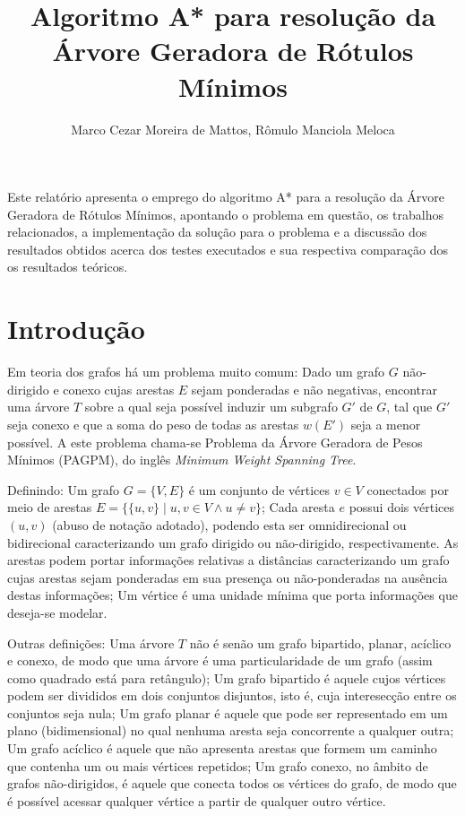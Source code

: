 \documentclass[12pt]{article}
\title{Algoritmo A* para resolução da Árvore Geradora de Rótulos Mínimos}
\author{Marco Cezar Moreira de Mattos\inst{1}, Rômulo Manciola Meloca\inst{1}}
\begin{document}
\maketitle

\begin{resumo}
	Este relatório apresenta o emprego do algoritmo A* para a resolução da Árvore Geradora de Rótulos Mínimos, apontando o problema em questão, os trabalhos relacionados, a implementação da solução para o problema e a discussão dos resultados obtidos acerca dos testes executados e sua respectiva comparação dos os resultados teóricos.
\end{resumo}

\section{Introdução}\label{sec:introducao}

	Em teoria dos grafos há um problema muito comum: Dado um grafo $G$ não-dirigido e conexo cujas arestas $E$ sejam ponderadas e não negativas, encontrar uma árvore $T$ sobre a qual seja possível induzir um subgrafo $G'$ de $G$, tal que $G'$ seja conexo e que a soma do peso de todas as arestas $w(E')$ seja a menor possível. A este problema chama-se Problema da Árvore Geradora de Pesos Mínimos (PAGPM), do inglês \textit{Minimum Weight Spanning Tree}.

	Definindo: Um grafo $G = \{V, E\}$ é um conjunto de vértices $v \in V$ conectados por meio de arestas $E = \{\{u, v\} \mid u, v \in V \wedge u \neq v\}$; Cada aresta $e$ possui dois vértices $(u, v)$ (abuso de notação adotado), podendo esta ser omnidirecional ou bidirecional caracterizando um grafo dirigido ou não-dirigido, respectivamente. As arestas podem portar informações relativas a distâncias caracterizando um grafo cujas arestas sejam ponderadas em sua presença ou não-ponderadas na ausência destas informações; Um vértice é uma unidade mínima que porta informações que deseja-se modelar.

	Outras definições: Uma árvore $T$ não é senão um grafo bipartido, planar, acíclico e conexo, de modo que uma árvore é uma particularidade de um grafo (assim como quadrado está para retângulo); Um grafo bipartido é aquele cujos vértices podem ser divididos em dois conjuntos disjuntos, isto é, cuja interesecção entre os conjuntos seja nula; Um grafo planar é aquele que pode ser representado em um plano (bidimensional) no qual nenhuma aresta seja concorrente a qualquer outra; Um grafo acíclico é aquele que não apresenta arestas que formem um caminho que contenha um ou mais vértices repetidos; Um grafo conexo, no âmbito de grafos não-dirigidos, é aquele que conecta todos os vértices do grafo, de modo que é possível acessar qualquer vértice a partir de qualquer outro vértice.
\end{document}
